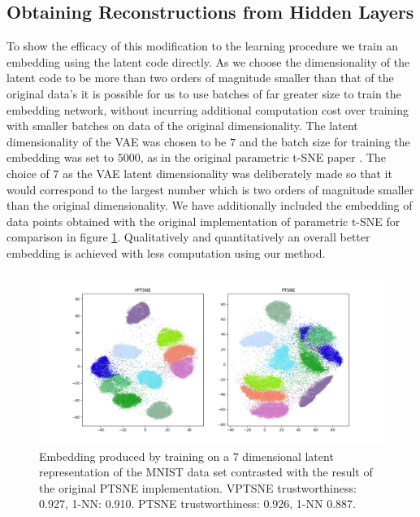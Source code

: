 \subsection{Obtaining Reconstructions from Hidden Layers}

To show the efficacy of this modification to the learning procedure we train an embedding using the latent code directly. As we choose the dimensionality of the latent code to be more than two orders of magnitude smaller than that of the original data's it is possible for us to use batches of far greater size to train the embedding network, without incurring additional computation cost over training with smaller batches on data of the original dimensionality. The latent dimensionality of the VAE was chosen to be $7$ and the batch size for training the embedding was set to $5000$, as in the original parametric t-SNE paper \cite{parametric_tsne}. The choice of $7$ as the VAE latent dimensionality was deliberately made so that it would correspond to the largest number which is two orders of magnitude smaller than the original dimensionality. We have additionally included the embedding of data points obtained with the original implementation of parametric t-SNE for comparison in figure \ref{fig:hidden_layer}. Qualitatively and quantitatively an overall better embedding is achieved with less computation using our method.

\begin{figure}[!htb]
  \centering
  \includegraphics[width=\textwidth]{images/vptsne_vs_original_ptsne_7.png}
  \caption{Embedding produced by training on a 7 dimensional latent representation of the MNIST data set contrasted with the result of the original PTSNE implementation. VPTSNE trustworthiness: 0.927, 1-NN: 0.910. PTSNE trustworthiness: 0.926, 1-NN 0.887.}
  \label{fig:hidden_layer}
\end{figure}


